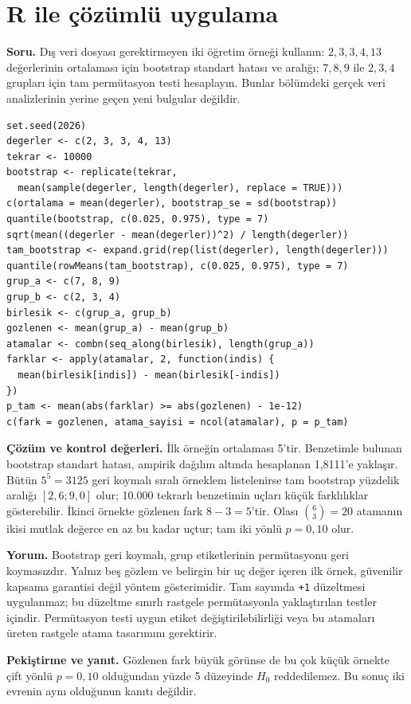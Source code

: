 \section{R ile çözümlü uygulama}
\label{sec:r-bootstrap}

\textbf{Soru.} Dış veri dosyası gerektirmeyen iki öğretim örneği kullanın:
$2,3,3,4,13$ değerlerinin ortalaması için bootstrap standart hatası ve
aralığı; $7,8,9$ ile $2,3,4$ grupları için tam permütasyon testi hesaplayın.
Bunlar bölümdeki gerçek veri analizlerinin yerine geçen yeni bulgular değildir.

\begin{lstlisting}[style=prismR]
set.seed(2026)
degerler <- c(2, 3, 3, 4, 13)
tekrar <- 10000
bootstrap <- replicate(tekrar,
  mean(sample(degerler, length(degerler), replace = TRUE)))
c(ortalama = mean(degerler), bootstrap_se = sd(bootstrap))
quantile(bootstrap, c(0.025, 0.975), type = 7)
sqrt(mean((degerler - mean(degerler))^2) / length(degerler))
tam_bootstrap <- expand.grid(rep(list(degerler), length(degerler)))
quantile(rowMeans(tam_bootstrap), c(0.025, 0.975), type = 7)
grup_a <- c(7, 8, 9)
grup_b <- c(2, 3, 4)
birlesik <- c(grup_a, grup_b)
gozlenen <- mean(grup_a) - mean(grup_b)
atamalar <- combn(seq_along(birlesik), length(grup_a))
farklar <- apply(atamalar, 2, function(indis) {
  mean(birlesik[indis]) - mean(birlesik[-indis])
})
p_tam <- mean(abs(farklar) >= abs(gozlenen) - 1e-12)
c(fark = gozlenen, atama_sayisi = ncol(atamalar), p = p_tam)
\end{lstlisting}

\begin{outputguidebox}
\textbf{Çözüm ve kontrol değerleri.} İlk örneğin ortalaması 5'tir.
Benzetimle bulunan bootstrap standart hatası, ampirik dağılım altında
hesaplanan 1,8111'e yaklaşır. Bütün $5^5=3125$ geri koymalı sıralı
örneklem listelenirse tam bootstrap yüzdelik aralığı $[2{,}6;9{,}0]$ olur;
10.000 tekrarlı benzetimin uçları küçük farklılıklar gösterebilir.
İkinci örnekte gözlenen fark $8-3=5$'tir. Olası $\binom{6}{3}=20$
atamanın ikisi mutlak değerce en az bu kadar uçtur; tam iki yönlü $p=0{,}10$ olur.
\end{outputguidebox}

\textbf{Yorum.} Bootstrap geri koymalı, grup etiketlerinin permütasyonu
geri koymasızdır. Yalnız beş gözlem ve belirgin bir uç değer içeren ilk örnek,
güvenilir kapsama garantisi değil yöntem gösterimidir. Tam sayımda
\texttt{+1} düzeltmesi uygulanmaz; bu düzeltme sınırlı rastgele permütasyonla
yaklaştırılan testler içindir. Permütasyon testi uygun etiket değiştirilebilirliği
veya bu atamaları üreten rastgele atama tasarımını gerektirir.

\textbf{Pekiştirme ve yanıt.} Gözlenen fark büyük görünse de bu çok küçük
örnekte çift yönlü $p=0{,}10$ olduğundan yüzde 5 düzeyinde $H_0$ reddedilemez.
Bu sonuç iki evrenin aynı olduğunun kanıtı değildir.